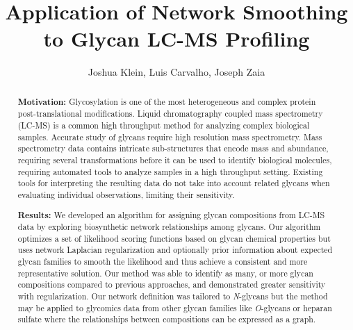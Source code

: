 \documentclass{article}
\newcommand{\nglycans}[0]{\textit{N}-glycans\xspace}
\begin{document}
\title{Application of Network Smoothing to Glycan LC-MS Profiling}
\author{Joshua Klein, Luis Carvalho, Joseph Zaia}
\begin{abstract}
\textbf{Motivation:} Glycosylation is one of the most heterogeneous
and complex protein post-translational modifications. Liquid chromatography
coupled mass spectrometry (LC-MS) is a common high throughput method for
analyzing complex biological samples. Accurate study of glycans require
high resolution mass spectrometry. Mass spectrometry data contains
intricate sub-structures that encode mass and abundance, requiring several
transformations before it can be used to identify biological molecules,
requiring automated tools to analyze samples in a high throughput setting.
Existing tools for interpreting the resulting data do not take into account
related glycans when evaluating individual observations, limiting their sensitivity.

\textbf{Results:} We developed an algorithm for assigning glycan compositions
from LC-MS data by exploring biosynthetic network relationships among glycans.
Our algorithm optimizes a set of likelihood scoring functions based on glycan
chemical properties but uses network Laplacian regularization and optionally
prior information about expected glycan families to smooth the likelihood and
thus achieve a consistent and more representative solution. Our method was able
to identify as many, or more glycan compositions compared to previous approaches,
and demonstrated greater sensitivity with regularization. Our network definition
was tailored to \nglycans but the method may be applied to glycomics data from
other glycan families like \textit{O}-glycans or heparan sulfate where the
relationships between compositions can be expressed as a graph.


\end{abstract}

\maketitle












\end{document}
